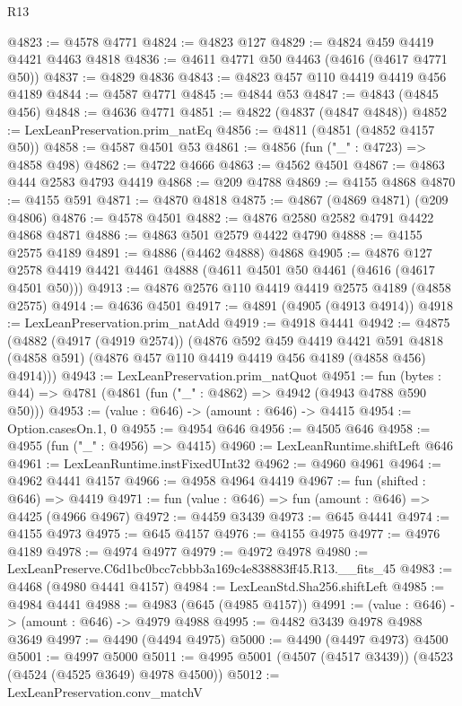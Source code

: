 \begin{lexlean}{R13}
\begin{coremodule}
@4823 := @4578 @4771
@4824 := @4823 @127
@4829 := @4824 @459 @4419 @4421 @4463 @4818
@4836 := @4611 @4771 @50 @4463 (@4616 (@4617 @4771 @50))
@4837 := @4829 @4836
@4843 := @4823 @457 @110 @4419 @4419 @456 @4189
@4844 := @4587 @4771
@4845 := @4844 @53
@4847 := @4843 (@4845 @456)
@4848 := @4636 @4771
@4851 := @4822 (@4837 (@4847 @4848))
@4852 := LexLeanPreservation.prim_natEq
@4856 := @4811 (@4851 (@4852 @4157 @50))
@4858 := @4587 @4501 @53
@4861 := @4856 (fun ("_" : @4723) => @4858 @498)
@4862 := @4722 @4666
@4863 := @4562 @4501
@4867 := @4863 @444 @2583 @4793 @4419
@4868 := @209 @4788
@4869 := @4155 @4868
@4870 := @4155 @591
@4871 := @4870 @4818
@4875 := @4867 (@4869 @4871) (@209 @4806)
@4876 := @4578 @4501
@4882 := @4876 @2580 @2582 @4791 @4422 @4868 @4871
@4886 := @4863 @501 @2579 @4422 @4790
@4888 := @4155 @2575 @4189
@4891 := @4886 (@4462 @4888) @4868
@4905 := @4876 @127 @2578 @4419 @4421 @4461 @4888 (@4611 @4501 @50 @4461 (@4616 (@4617 @4501 @50)))
@4913 := @4876 @2576 @110 @4419 @4419 @2575 @4189 (@4858 @2575)
@4914 := @4636 @4501
@4917 := @4891 (@4905 (@4913 @4914))
@4918 := LexLeanPreservation.prim_natAdd
@4919 := @4918 @4441
@4942 := @4875
    (@4882
      (@4917 (@4919 @2574))
      (@4876
        @592
        @459
        @4419
        @4421
        @591
        @4818
        (@4858 @591)
        (@4876 @457 @110 @4419 @4419 @456 @4189 (@4858 @456) @4914)))
@4943 := LexLeanPreservation.prim_natQuot
@4951 := fun (bytes : @44) => @4781 (@4861 (fun ("_" : @4862) => @4942 (@4943 @4788 @590 @50)))
@4953 := (value : @646) -> (amount : @646) -> @4415
@4954 := Option.casesOn.{1, 0}
@4955 := @4954 @646
@4956 := @4505 @646
@4958 := @4955 (fun ("_" : @4956) => @4415)
@4960 := LexLeanRuntime.shiftLeft @646
@4961 := LexLeanRuntime.instFixedUInt32
@4962 := @4960 @4961
@4964 := @4962 @4441 @4157
@4966 := @4958 @4964 @4419
@4967 := fun (shifted : @646) => @4419
@4971 := fun (value : @646) => fun (amount : @646) => @4425 (@4966 @4967)
@4972 := @4459 @3439
@4973 := @645 @4441
@4974 := @4155 @4973
@4975 := @645 @4157
@4976 := @4155 @4975
@4977 := @4976 @4189
@4978 := @4974 @4977
@4979 := @4972 @4978
@4980 := LexLeanPreserve.C6d1bc0bcc7cbbb3a169c4e838883ff45.R13.__fits_45
@4983 := @4468 (@4980 @4441 @4157)
@4984 := LexLeanStd.Sha256.shiftLeft
@4985 := @4984 @4441
@4988 := @4983 (@645 (@4985 @4157))
@4991 := (value : @646) -> (amount : @646) -> @4979 @4988
@4995 := @4482 @3439 @4978 @4988 @3649
@4997 := @4490 (@4494 @4975)
@5000 := @4490 (@4497 @4973) @4500
@5001 := @4997 @5000
@5011 := @4995 @5001 (@4507 (@4517 @3439)) (@4523 (@4524 (@4525 @3649) @4978 @4500))
@5012 := LexLeanPreservation.conv_matchV

\end{coremodule}
\end{lexlean}

